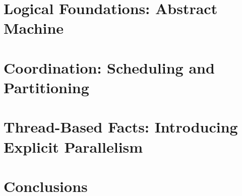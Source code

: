 \documentclass[12pt]{cmuthesis}
\theoremstyle{indented}
\begin{document}
\chapter{Logical Foundations: Abstract Machine}



\chapter{Coordination: Scheduling and Partitioning}\label{chapter:coordination}


\chapter{Thread-Based Facts: Introducing Explicit Parallelism}



\chapter{Conclusions}


\appendix


\backmatter


\renewcommand{\bibsection}{\chapter{\bibname}}

\end{document}
